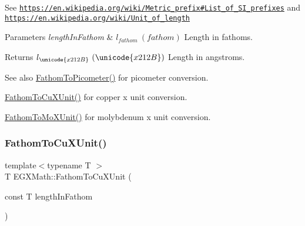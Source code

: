 See \href{https://en.wikipedia.org/wiki/Metric_prefix#List_of_SI_prefixes}{\tt https\+://en.\+wikipedia.\+org/wiki/\+Metric\+\_\+prefix\#\+List\+\_\+of\+\_\+\+S\+I\+\_\+prefixes} and \href{https://en.wikipedia.org/wiki/Unit_of_length}{\tt https\+://en.\+wikipedia.\+org/wiki/\+Unit\+\_\+of\+\_\+length} 
\begin{DoxyParams}{Parameters}
{\em length\+In\+Fathom} & $ l_{fathom}\ (fathom)$ Length in fathoms. \\
\hline
\end{DoxyParams}
\begin{DoxyReturn}{Returns}
$ l_{\unicode{x212B}}\ (\unicode{x212B})$ Length in angstroms. 
\end{DoxyReturn}
\begin{DoxySeeAlso}{See also}
\mbox{\hyperlink{group___e_g_x_math-_conversions-_length_conversions-_nautical-_fathom-_s_i_gad5fe5d3a1a48420dc43cd2826a9b6f71}{Fathom\+To\+Picometer()}} for picometer conversion. 

\mbox{\hyperlink{group___e_g_x_math-_conversions-_length_conversions-_nautical-_fathom-_non-_s_i_ga6692d3fad4af03d78145e34bf0a6c2ac}{Fathom\+To\+Cu\+X\+Unit()}} for copper x unit conversion. 

\mbox{\hyperlink{group___e_g_x_math-_conversions-_length_conversions-_nautical-_fathom-_non-_s_i_ga1e69cf778d1b7f72cd015b6cc81fc71c}{Fathom\+To\+Mo\+X\+Unit()}} for molybdenum x unit conversion. 
\end{DoxySeeAlso}
\mbox{\label{group___e_g_x_math-_conversions-_length_conversions-_nautical-_fathom-_non-_s_i_ga6692d3fad4af03d78145e34bf0a6c2ac}} 
\subsubsection{\texorpdfstring{Fathom\+To\+Cu\+X\+Unit()}{FathomToCuXUnit()}}
{\footnotesize\ttfamily template$<$typename T $>$ \\
T E\+G\+X\+Math\+::\+Fathom\+To\+Cu\+X\+Unit (\begin{DoxyParamCaption}\item[{const T}]{length\+In\+Fathom }\end{DoxyParamCaption})}



